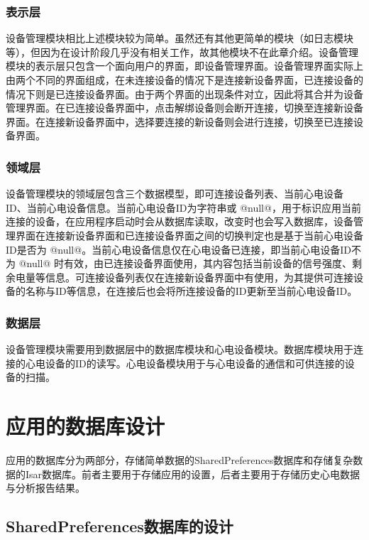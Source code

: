 \subsubsection{表示层}

设备管理模块相比上述模块较为简单。虽然还有其他更简单的模块（如日志模块等），但因为在设计阶段几乎没有相关工作，故其他模块不在此章介绍。设备管理模块的表示层只包含一个面向用户的界面，即设备管理界面。设备管理界面实际上由两个不同的界面组成，在未连接设备的情况下是连接新设备界面，已连接设备的情况下则是已连接设备界面。由于两个界面的出现条件对立，因此将其合并为设备管理界面。在已连接设备界面中，点击解绑设备则会断开连接，切换至连接新设备界面。在连接新设备界面中，选择要连接的新设备则会进行连接，切换至已连接设备界面。

\subsubsection{领域层}

设备管理模块的领域层包含三个数据模型，即可连接设备列表、当前心电设备ID、当前心电设备信息。当前心电设备ID为字符串或 @null@，用于标识应用当前连接的设备，在应用程序启动时会从数据库读取，改变时也会写入数据库，设备管理界面在连接新设备界面和已连接设备界面之间的切换判定也是基于当前心电设备ID是否为 @null@。当前心电设备信息仅在心电设备已连接，即当前心电设备ID不为 @null@ 时有效，由已连接设备界面使用，其内容包括当前设备的信号强度、剩余电量等信息。可连接设备列表仅在连接新设备界面中有使用，为其提供可连接设备的名称与ID等信息，在连接后也会将所连接设备的ID更新至当前心电设备ID。

\subsubsection{数据层}

设备管理模块需要用到数据层中的数据库模块和心电设备模块。数据库模块用于连接的心电设备的ID的读写。心电设备模块用于与心电设备的通信和可供连接的设备的扫描。


\section{应用的数据库设计}\label{sec:db-design}

应用的数据库分为两部分，存储简单数据的SharedPreferences数据库和存储复杂数据的Isar数据库。前者主要用于存储应用的设置，后者主要用于存储历史心电数据与分析报告结果。

\subsection{SharedPreferences数据库的设计}\label{subsec:shared-preferences}

